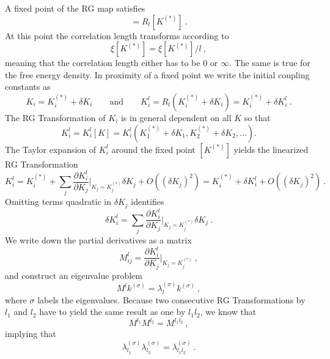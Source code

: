 	A fixed point of the RG	map satisfies
	\begin{equation}
		[K^{(*)}] =	R_l[K^{(*)}] ~.
	\end{equation}
	At this point the correlation length transforms according to
	\begin{equation}
		\xi[K^{(*)}] =	\xi[K^{(*)}] / l~,
	\end{equation}
	meaning that the correlation length either has to be $0$ or $\infty$. The same is true for the free energy density. In proximity of a fixed point we write the initial coupling constants as
	\begin{equation}
		K_i =	K_i^{(*)} + \delta K_i \qquad \text{and} \qquad K_i^l =	R_l(K_i^{(*)} + \delta K_i) =	K_i^{(*)} + \delta K_i^l~.
	\end{equation}
	The RG Transformation of $K_i$ is in general dependent on all $K$ so that
	\begin{equation}
		K^l_i =	K^l_i[K] =	K^l_i(K_1^{(*)} + \delta K_1, K_2^{(*)} + \delta K_2, ...).
	\end{equation}
	The Taylor expansion of $K_i^l$ around the fixed point $[K^{(*)}]$ yields the linearized RG Transformation
	\begin{equation} \label{linearized-RG}
		K_i^l =	K_i^{(*)} + \sum_j \frac{\partial K_i^l}{\partial K_j} \bigg |_{K_j = K_j^{(*)}} \delta K_j + O((\delta K_j)^2) = K_i^{(*)} + \delta K_i^l + O((\delta K_j)^2) ~.
	\end{equation}
	Omitting terms quadratic in $\delta K_j$ identifies
	\begin{equation}
		\delta K_i^l =	\sum_j \frac{\partial K_i^l}{\partial K_j} \bigg |_{K_j = K_j^{(*)}} \delta K_j~.
	\end{equation}
	We write down the partial derivatives as a matrix
	\begin{equation}
		M^l_{ij} =	\frac{\partial K_i^l}{\partial K_j} \bigg |_{K_j = K_j^{(*)}}~,
	\end{equation}
	and construct an eigenvalue problem
	\begin{equation} \label{ev-problem}
		M^l k^{(\sigma)} =	\lambda^{(\sigma)}_l k^{(\sigma)}~,
	\end{equation}
	where $\sigma$ labels the eigenvalues. Because two consecutive RG Transformations by $l_1$ and $l_2$ have to yield the same result as one  by $l_1l_2$, we know that
	\begin{equation}
		M^{l_1}M^{l_2} =	M^{l_1l_2}~,
	\end{equation}
	implying that
	\begin{equation}
		\lambda_{l_1}^{(\sigma)} \lambda_{l_2}^{(\sigma)} =	\lambda_{l_1l_2}^{(\sigma)} ~.
		\label{ev-equation}
	\end{equation}

